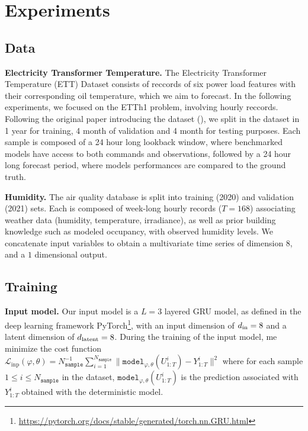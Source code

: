 \documentclass{article}
\begin{document}
\section{Experiments}
\label{sec:exp}

\subsection{Data}
\label{sub:data}
\textbf{Electricity Transformer Temperature.}
The Electricity Transformer Temperature (ETT) Dataset consists of reccords of six power load features with their corresponding oil temperature, which we aim to forecast.
In the following experiments, we focused on the ETTh1 problem, involving hourly reccords.
Following the original paper introducing the dataset (\cite{Zhou2021Informer}), we split in the dataset in 1 year for training, 4 month of validation and 4 month for testing purposes.
Each sample is composed of a 24 hour long lookback window, where benchmarked models have access to both commands and observations, followed by a 24 hour long forecast period, where models performances are compared to the ground truth.

\textbf{Humidity.}
The air quality database is split into training (2020) and validation (2021) sets.
Each is composed of week-long hourly records ($T=168$) associating weather data (humidity, temperature, irradiance), as well as prior building knowledge such as modeled occupancy, with observed humidity levels.
We concatenate input variables to obtain a multivariate time series of dimension $8$, and a $1$ dimensional output.

\subsection{Training}%
\label{sub:training}

{\bf Input model.} Our input model is a $L=3$ layered GRU model, as defined in the deep learning framework PyTorch\footnote{\href{https://pytorch.org/docs/stable/generated/torch.nn.GRU.html}{https://pytorch.org/docs/stable/generated/torch.nn.GRU.html}}, with an input dimension of $d_\textnormal{in}=8$ and a latent dimension of $d_\textnormal{latent}=8$.
During the training of the input model, me minimize the cost function $\mathcal{L}_{\mathrm{inp}}(\varphi,\theta) = N_{\texttt{sample}}^{-1} \sum_{i=1}^{N_{\texttt{sample}}} \|\texttt{model}_{\varphi,\theta}(U^i_{1:T}) - Y^i_{1:T}\|^2$ where for each sample $1 \leq i \leq N_{\texttt{sample}}$ in the dataset, $\texttt{model}_{\varphi,\theta}(U^i_{1:T})$ is the prediction associated with $Y^i_{1:T}$ obtained with the deterministic model.
\end{document}
